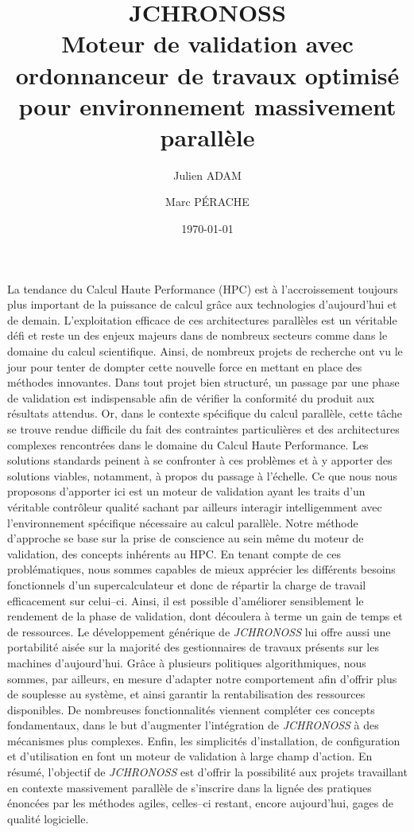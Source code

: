 \documentclass[10pt]{article}
\title{\textbf{JCHRONOSS} \\ Moteur de validation avec ordonnanceur de travaux optimisé pour environnement massivement parallèle}
\author{Julien ADAM \and Marc PÉRACHE}
\date{\today}
\begin{document}
\maketitle
\thispagestyle{empty} %
La tendance du Calcul Haute Performance (HPC) est à l'accroissement toujours plus important de la puissance de calcul grâce aux technologies d'aujourd'hui et de demain. L'exploitation efficace de ces architectures parallèles est un véritable défi et reste un des enjeux majeurs dans de nombreux secteurs comme dans le domaine du calcul scientifique. Ainsi, de nombreux projets de recherche ont vu le jour pour tenter de dompter cette nouvelle force en mettant en place des méthodes innovantes. Dans tout projet bien structuré, un passage par une phase de validation est indispensable afin de vérifier la conformité du produit aux résultats attendus. Or, dans le contexte spécifique du calcul parallèle, cette tâche se trouve rendue difficile du fait des contraintes particulières et des architectures complexes rencontrées dans le domaine du Calcul Haute Performance. Les solutions standards peinent à se confronter à ces problèmes et à y apporter des solutions viables, notamment, à propos du passage à l'échelle. Ce que nous nous proposons d'apporter ici est un moteur de validation ayant les traits d'un véritable contrôleur qualité sachant par ailleurs interagir intelligemment avec l'environnement spécifique nécessaire au calcul parallèle. Notre méthode d'approche se base sur la prise de conscience au sein même du moteur de validation, des concepts inhérents au HPC. En tenant compte de ces problématiques, nous sommes capables de mieux apprécier les différents besoins fonctionnels d'un supercalculateur et donc de répartir la charge de travail efficacement sur celui--ci. Ainsi, il est possible d'améliorer sensiblement le rendement de la phase de validation, dont découlera à terme un gain de temps et de ressources. Le développement générique de \textit{JCHRONOSS} lui offre aussi une portabilité aisée sur la majorité des gestionnaires de travaux présents sur les machines d'aujourd'hui. Grâce à plusieurs politiques algorithmiques, nous sommes, par ailleurs, en mesure d'adapter notre comportement afin d'offrir plus de souplesse au système, et ainsi garantir la rentabilisation des ressources disponibles. De nombreuses fonctionnalités viennent compléter ces concepts fondamentaux, dans le but d'augmenter l'intégration de \textit{JCHRONOSS} à des mécanismes plus complexes. Enfin, les simplicités d'installation, de configuration et d'utilisation en font un moteur de validation à large champ d'action. En résumé, l'objectif de \textit{JCHRONOSS} est d'offrir la possibilité aux projets travaillant en contexte massivement parallèle de s'inscrire dans la lignée des pratiques énoncées par les méthodes agiles, celles--ci restant, encore aujourd'hui, gages de qualité logicielle.
\end{document}
